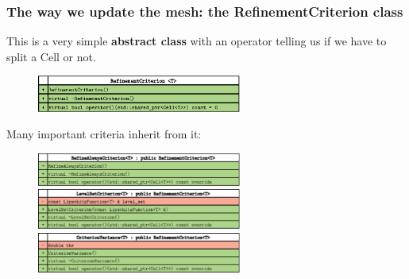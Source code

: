 \documentclass[8pt]{beamer}
\begin{document}
\begin{frame}
 \frametitle{The way we update the mesh: the RefinementCriterion class}\pause
This is a very simple \textbf{abstract class} with an operator telling us if we have to split a Cell or not.
\begin{figure}[!h]
\begin{center}
\includegraphics[width=0.6\textwidth]{./figures/refinementcriterion_h.eps}
\end{center}
\end{figure}\pause
Many important criteria inherit from it:
\begin{figure}[!h]
\begin{center}
\includegraphics[width=0.6\textwidth]{./figures/RefineAlwaysCriterion_h.eps}
\includegraphics[width=0.6\textwidth]{./figures/LevelSetCriterion_h.eps}
\includegraphics[width=0.6\textwidth]{./figures/CriterionVariance_h.eps}
\end{center}
\end{figure}
\end{frame}
\end{document}
